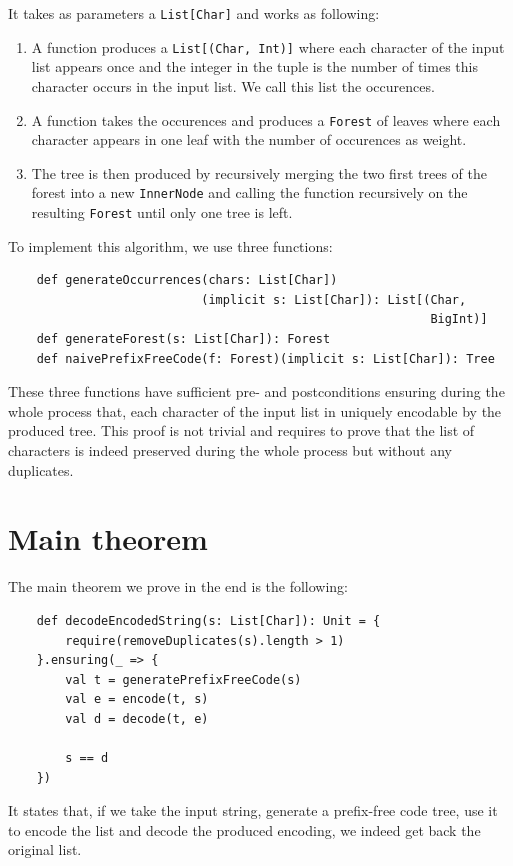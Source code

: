 \documentclass[a4paper,UKenglish,cleveref, autoref, thm-restate]{lipics-v2021}
\begin{document}
It takes as parameters a \lstinline{List[Char]} and works as following:
\begin{enumerate}
    \item A function produces a \lstinline{List[(Char, Int)]} where each character of the input list appears once and the integer in the tuple is the number of times this character occurs in the input list. We call this list the occurences.
    \item A function takes the occurences and produces a \lstinline{Forest} of leaves where each character appears in one leaf with the number of occurences as weight.
    \item The tree is then produced by recursively merging the two first trees of the forest into a new \lstinline{InnerNode} and calling the function recursively on the resulting \lstinline{Forest} until only one tree is left.
\end{enumerate}

To implement this algorithm, we use three functions:
\begin{lstlisting}
    def generateOccurrences(chars: List[Char])
                           (implicit s: List[Char]): List[(Char,
                                                           BigInt)]
    def generateForest(s: List[Char]): Forest
    def naivePrefixFreeCode(f: Forest)(implicit s: List[Char]): Tree
\end{lstlisting}

These three functions have sufficient pre- and postconditions ensuring during the whole process that,  each character of the input list in uniquely encodable by the produced tree.
This proof is not trivial and requires to prove that the list of characters is indeed preserved during the whole process but without any duplicates.

\section{Main theorem}
The main theorem we prove in the end is the following:
\begin{lstlisting}
    def decodeEncodedString(s: List[Char]): Unit = {
        require(removeDuplicates(s).length > 1)
    }.ensuring(_ => {
        val t = generatePrefixFreeCode(s)
        val e = encode(t, s)
        val d = decode(t, e)

        s == d
    })
\end{lstlisting}

It states that, if we take the input string, generate a prefix-free code tree, use it to encode the list and decode the produced encoding, we indeed get back the original list.
\end{document}
